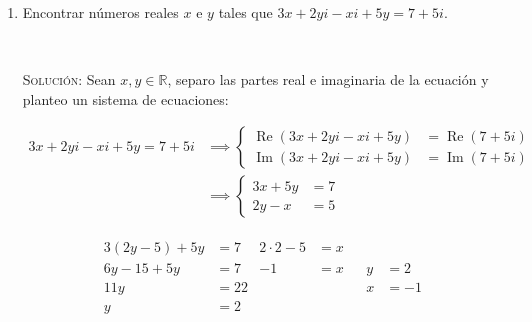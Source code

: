 \documentclass[12pt]{amsart}
\begin{document}
\begin{enumerate}
\newpage

\item Encontrar n\'umeros reales $x$ e $y$ tales que $3x+2yi-xi+5y = 7 + 5i$.

\

\textsc{Solución:} Sean $x, y \in \mathbb{R}$, separo las partes real e imaginaria de la ecuación y planteo un sistema de ecuaciones:

\begin{equation*}
\begin{array}{rl}
3x+2yi-xi+5y = 7 + 5i &\implies \left\{ \begin{array}{rl}
\operatorname{Re} (3x+2yi-xi+5y) &= \operatorname{Re} ( 7 + 5i)	\\
\operatorname{Im} (3x+2yi-xi+5y) &= \operatorname{Im}( 7 + 5i)
\end{array}\right. \\
&\implies \left\{ \begin{array}{rl}
3x+ 5y &= 7	\\
2y -x &= 5
\end{array}\right.
\end{array}
\end{equation*}

\begin{equation*}
\begin{array}{l|r}
\begin{array}{rl|rl}
3 (2y -5) + 5y &= 7		 &	2 \cdot 2 - 5 &= x \\
6y - 15 + 5 y &= 7		 &	-1 &= x \\
11 y &= 22	& &  \\
y &= 2		& & 
\end{array} & 
\boxed{\begin{array}{rl}
y &= 2 \\
x &= -1
\end{array}}
\end{array}
\end{equation*}

\

\



\end{enumerate}
\end{document}
